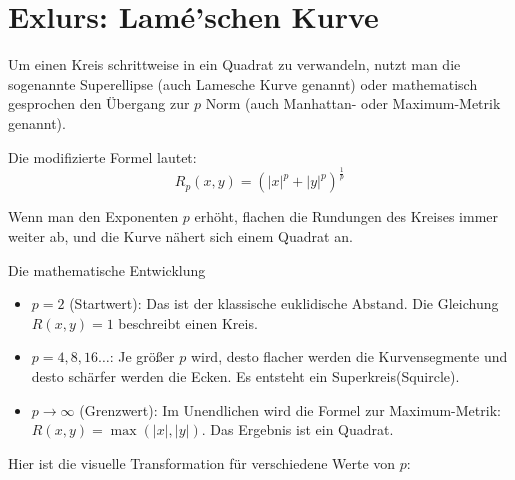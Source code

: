 \section{Exlurs: Lamé'schen Kurve}

Um einen Kreis schrittweise in ein Quadrat zu verwandeln, nutzt man die sogenannte Superellipse (auch Lamesche Kurve genannt) oder mathematisch gesprochen den Übergang zur $p$ Norm (auch Manhattan- oder Maximum-Metrik genannt).

Die modifizierte Formel lautet:
\begin{equation}
    R_{p}(x,y) = 
    \left(|x|^{p}+|y|^{p}\right)^{\frac{1}{p}}
\end{equation}

Wenn man den Exponenten $p$ erhöht, flachen die Rundungen des Kreises immer weiter ab, und die Kurve nähert sich einem Quadrat an.

Die mathematische Entwicklung
\begin{itemize}
    \item  $p = 2$ (Startwert): Das ist der klassische euklidische Abstand. Die Gleichung $R(x,y) = 1$ beschreibt einen Kreis.
    \item  $p = 4, 8, 16 \dots$: Je größer $p$ wird, desto flacher werden die Kurvensegmente und desto schärfer werden die Ecken. Es entsteht ein \glqq Superkreis\grqq (Squircle).
    \item  $p \to \infty$ (Grenzwert): Im Unendlichen wird die Formel zur Maximum-Metrik: $R(x, y) = \max(\vert{}x\vert{}, \vert{}y\vert{})$. Das Ergebnis ist ein Quadrat.
\end{itemize} 

Hier ist die visuelle Transformation für verschiedene Werte von $p$:

